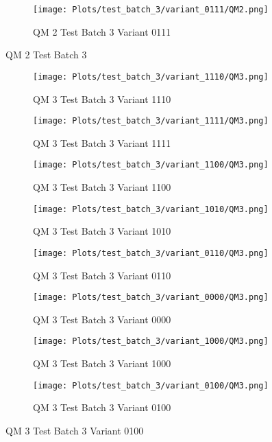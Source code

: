 \documentclass{DissertateFigs}
\begin{document}
\begin{figure}[t!]
\medskip

    \begin{subfigure}{0.47\textwidth}
    \texttt{[image: Plots/test\_batch\_3/variant\_0111/QM2.png]}
    \caption{QM 2 Test Batch 3 Variant 0111}
    \end{subfigure}
\caption{QM 2 Test Batch 3}
    \end{figure}
\clearpage
\begin{figure}[t!]
    \begin{subfigure}{0.47\textwidth}
    \texttt{[image: Plots/test\_batch\_3/variant\_1110/QM3.png]}
    \caption{QM 3 Test Batch 3 Variant 1110}
    \end{subfigure}
    \begin{subfigure}{0.47\textwidth}
    \texttt{[image: Plots/test\_batch\_3/variant\_1111/QM3.png]}
    \caption{QM 3 Test Batch 3 Variant 1111}
    \end{subfigure}

\medskip

    \begin{subfigure}{0.47\textwidth}
    \texttt{[image: Plots/test\_batch\_3/variant\_1100/QM3.png]}
    \caption{QM 3 Test Batch 3 Variant 1100}
    \end{subfigure}
    \begin{subfigure}{0.47\textwidth}
    \texttt{[image: Plots/test\_batch\_3/variant\_1010/QM3.png]}
    \caption{QM 3 Test Batch 3 Variant 1010}
    \end{subfigure}

\medskip

    \begin{subfigure}{0.47\textwidth}
    \texttt{[image: Plots/test\_batch\_3/variant\_0110/QM3.png]}
    \caption{QM 3 Test Batch 3 Variant 0110}
    \end{subfigure}
    \begin{subfigure}{0.47\textwidth}
    \texttt{[image: Plots/test\_batch\_3/variant\_0000/QM3.png]}
    \caption{QM 3 Test Batch 3 Variant 0000}
    \end{subfigure}

\medskip

    \begin{subfigure}{0.47\textwidth}
    \texttt{[image: Plots/test\_batch\_3/variant\_1000/QM3.png]}
    \caption{QM 3 Test Batch 3 Variant 1000}
    \end{subfigure}
    \begin{subfigure}{0.47\textwidth}
    \texttt{[image: Plots/test\_batch\_3/variant\_0100/QM3.png]}
    \caption{QM 3 Test Batch 3 Variant 0100}
    \end{subfigure}


\end{figure}
\end{document}
